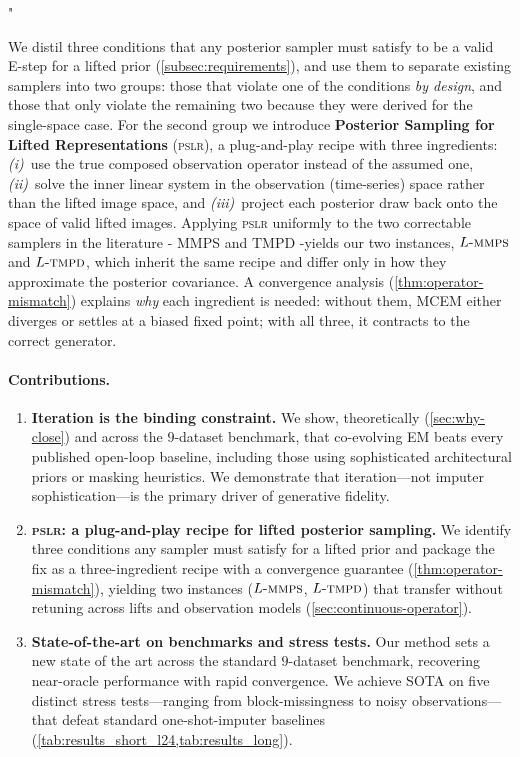 "\documentclass{article}
\theoremstyle{plain}
\theoremstyle{definition}
\theoremstyle{remark}
\newcommand{\pslr}{\textsc{pslr}}
\newcommand{\lmmps}{L\mbox{-}\textsc{mmps}}
\newcommand{\ltmpd}{L\mbox{-}\textsc{tmpd}}
\begin{document}
We distil three conditions that any posterior sampler must satisfy to be a valid E-step for a lifted prior (\cref{subsec:requirements}), and use them to separate existing samplers into two groups: those that violate one of the conditions \emph{by design}, and those that only violate the remaining two because they were derived for the single-space case. For the second group we introduce \textbf{Posterior Sampling for Lifted Representations} (\pslr{}), a plug-and-play recipe with three ingredients: \emph{(i)}~use the true composed observation operator instead of the assumed one, \emph{(ii)}~solve the inner linear system in the observation (time-series) space rather than the lifted image space, and \emph{(iii)}~project each posterior draw back onto the space of valid lifted images. Applying \pslr{} uniformly to the two correctable samplers in the literature - MMPS \citep{rozet2024diem} and TMPD \citep{boys2023tmpd}-yields our two instances, $\lmmps$ and $\ltmpd$, which inherit the same recipe and differ only in how they approximate the posterior covariance. A convergence analysis (\cref{thm:operator-mismatch}) explains \emph{why} each ingredient is needed: without them, MCEM either diverges or settles at a biased fixed point; with all three, it contracts to the correct generator.

\vspace{-1mm}
\paragraph{Contributions.}
\vspace{-1mm}
\begin{enumerate}
\setlength{\itemsep}{2pt}

\item \textbf{Iteration is the binding constraint.} We show, theoretically (\cref{sec:why-close}) and across the $9$-dataset benchmark, that co-evolving EM beats every published open-loop baseline, including those using sophisticated architectural priors or masking heuristics. We demonstrate that iteration—not imputer sophistication—is the primary driver of generative fidelity.

\item \textbf{\pslr{}: a plug-and-play recipe for lifted posterior sampling.} We identify three conditions any sampler must satisfy for a lifted prior and package the fix as a three-ingredient recipe with a convergence guarantee (\cref{thm:operator-mismatch}), yielding two instances ($\lmmps$, $\ltmpd$) that transfer without retuning across lifts and observation models (\cref{sec:continuous-operator}).

\item \textbf{State-of-the-art on benchmarks and stress tests.} Our method sets a new state of the art across the standard $9$-dataset benchmark, recovering near-oracle performance with rapid convergence. We achieve SOTA on five distinct stress tests—ranging from block-missingness to noisy observations—that defeat standard one-shot-imputer baselines (\cref{tab:results_short_l24,tab:results_long}).

\end{enumerate}
\end{document}

